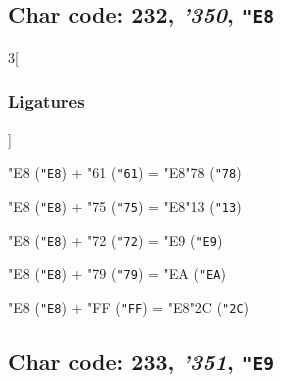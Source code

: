 \documentclass{article}
\newlength{\maxcharwidth}
\begin{document}
\subsection{Char code: 232, {\it'350}, {\tt"E8}}
\label{char_232}


\begin{multicols}{3}[\subsubsection{Ligatures}]

{\testfont\char"E8\noboundary} ({\tt"E8}) + {\testfont\char"61\noboundary} ({\tt"61}) = {\testfont\char"E8\noboundary}{\testfont\char"78\noboundary} ({\tt"78}) 

{\testfont\char"E8\noboundary} ({\tt"E8}) + {\testfont\char"75\noboundary} ({\tt"75}) = {\testfont\char"E8\noboundary}{\testfont\char"13\noboundary} ({\tt"13}) 

{\testfont\char"E8\noboundary} ({\tt"E8}) + {\testfont\char"72\noboundary} ({\tt"72}) = {\testfont\char"E9\noboundary} ({\tt"E9}) 

{\testfont\char"E8\noboundary} ({\tt"E8}) + {\testfont\char"79\noboundary} ({\tt"79}) = {\testfont\char"EA\noboundary} ({\tt"EA}) 

{\testfont\char"E8\noboundary} ({\tt"E8}) + {\testfont\char"FF\noboundary} ({\tt"FF}) = {\testfont\char"E8\noboundary}{\testfont\char"2C\noboundary} ({\tt"2C}) 

\end{multicols}

\subsection{Char code: 233, {\it'351}, {\tt"E9}}
\label{char_233}

\end{document}
